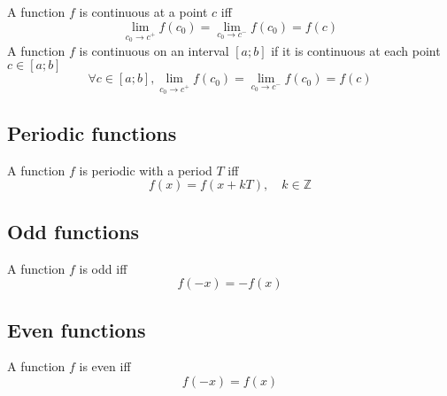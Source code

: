 \documentclass[a4paper]{article}
\begin{document}
A function \(f\) is continuous at a point \(c\) iff
\[
    \lim_{c_0 \to c^+} f(c_0) = \lim_{c_0 \to c^-} f(c_0) = f(c)
\]
A function \(f\) is continuous on an interval \([a;b]\) if it is continuous at each point \(c \in [a;b]\)
\[
    \forall c \in [a;b],
    \lim_{c_0 \to c^+} f(c_0) = \lim_{c_0 \to c^-} f(c_0) = f(c)
\]

\subsection{Periodic functions}

A function \(f\) is periodic with a period \(T\) iff
\[
    f(x) = f(x + kT), \quad k \in \mathbb{Z}
\]

\subsection{Odd functions}

A function \(f\) is odd iff
\[
    f(-x) = -f(x)
\]

\subsection{Even functions}

A function \(f\) is even iff
\[
    f(-x) = f(x)
\]
\end{document}
